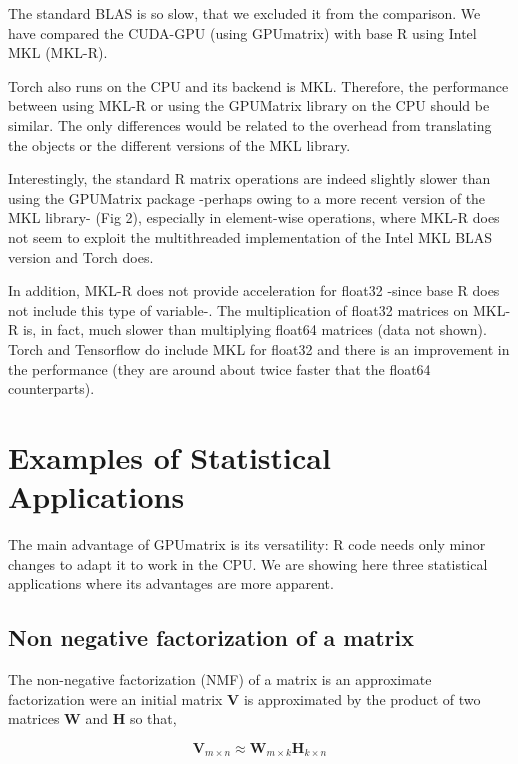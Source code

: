 The standard BLAS is so slow, that we excluded it from the comparison. We have compared the CUDA-GPU (using GPUmatrix) with base R using Intel MKL (MKL-R).

Torch also runs on the CPU and its backend is MKL. Therefore, the performance between using MKL-R or using the GPUMatrix library on the CPU should be similar. The only differences would be related to the overhead from translating the objects or the different versions of the MKL library.

Interestingly, the standard R matrix operations are indeed slightly slower than using the GPUMatrix package -perhaps owing to a more recent version of the MKL library- (Fig 2), especially in element-wise operations, where MKL-R does not seem to exploit the multithreaded implementation of the Intel MKL BLAS version and Torch does.

In addition, MKL-R does not provide acceleration for float32 -since base R does not include this type of variable-. The multiplication of float32 matrices on MKL-R is, in fact, much slower than multiplying float64 matrices (data not shown). Torch and Tensorflow do include MKL for float32 and there is an improvement in the performance (they are around about twice faster that the float64 counterparts).

\hypertarget{examples-of-statistical-applications}{%
\section{Examples of Statistical Applications}\label{examples-of-statistical-applications}}

The main advantage of GPUmatrix is its versatility: R code needs only minor changes to adapt it to work in the CPU. We are showing here three statistical applications where its advantages are more apparent.

\hypertarget{non-negative-factorization-of-a-matrix}{%
\subsection{Non negative factorization of a matrix}\label{non-negative-factorization-of-a-matrix}}

The non-negative factorization (NMF) of a matrix is an approximate factorization were an initial matrix \textbf{V} is approximated by the product of two matrices \textbf{W} and \textbf{H} so that,

\[
\mathbf{V}_{m \times n} \approx \mathbf{W}_{m \times k}\mathbf{H}_{k \times n}
\]


